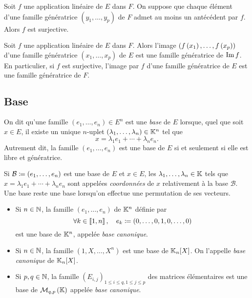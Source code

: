 \documentclass{magnolia}
\begin{document}
\begin{proposition}[utile=-2]
Soit $f$ une application linéaire de $E$ dans $F$. On suppose que chaque
élément d'une famille génératrice $(y_1,\ldots,y_p)$ de $F$ admet
au moins un antécédent par $f$. Alors $f$ est surjective.
\end{proposition}

\begin{proposition}[utile=-2]
Soit $f$ une application linéaire de $E$ dans $F$. Alors l'image
$(f\left(x_1\right),\ldots,f\left(x_p\right))$ d'une famille génératrice $(x_1,\ldots,x_p)$ de $E$ est
une famille génératrice de $\operatorname{Im} f$.
En particulier, si $f$ est surjective, l'image par $f$
d'une famille génératrice de $E$ est une famille génératrice de $F$.
\end{proposition}

\subsection{Base}

\begin{definition}[utile=-3]
On dit qu'une famille $(e_1,\ldots,e_n)\in E^n$ est une \emph{base} de $E$ lorsque,
quel que soit $x\in E$, il existe un unique $n$-uplet $\left(\lambda_1,\ldots,\lambda_n\right)\in\mathbb{K}^n$ tel que
\[x=\lambda_1 e_1+\cdots+\lambda_n e_n.\]
Autrement dit, la famille $(e_1,\ldots,e_n)$ est une base de $E$ si et seulement si elle est libre et génératrice.
\end{definition}

\begin{remarques}
\remarque Si $\mathcal{B}\coloneqq(e_1,\ldots,e_n)$ est une base de $E$ et $x\in E$, les
  $\lambda_1,\ldots,\lambda_n\in\mathbb{K}$ tels que $x=\lambda_1 e_1+\cdots+\lambda_n e_n$ sont appelées
  \emph{coordonnées} de $x$ relativement à la base $\mathcal{B}$.
\remarque[utile=-3] Une base reste une base lorsqu'on effectue une permutation de ses
  vecteurs.
\end{remarques}

\begin{definition}[utile=-3]
\begin{itemize}
\item Si $n\in\mathbb{N}$, la famille $(e_1,\ldots,e_n)$ de $\mathbb{K}^n$ définie par
  \[\forall k\in\left\llbracket 1,n\right\rrbracket ,\quad e_k\coloneqq \left(0,\ldots,0,1,0,\ldots,0\right)\]
  est une base de $\mathbb{K}^n$, appelée \emph{base canonique}.
\item Si $n\in\mathbb{N}$, la famille $(1,X,\ldots,X^n)$ est une base de $\polyK[n]$.
  On l'appelle \emph{base canonique} de $\polyK[n]$.
\item Si $p,q\in\mathbb{N}$, la famille $(E_{i,j})_{1\leq i\leq q, 1\leq j\leq p}$ des
  matrices élémentaires est une base de $\mathcal{M}_{q,p}\left(\mathbb{K}\right)$ appelée
  \emph{base canonique}.
\end{itemize}
\end{definition}
\end{document}
